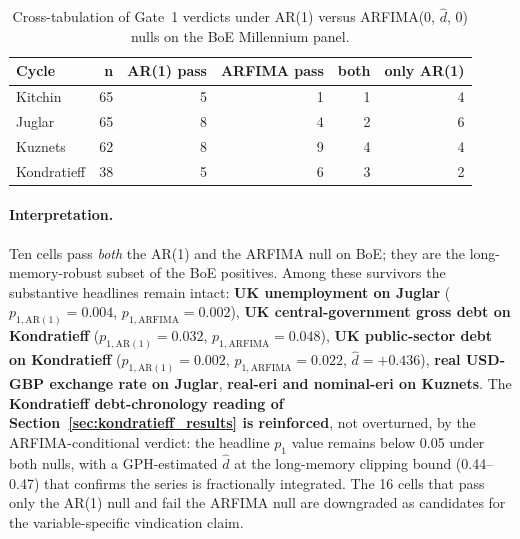 \begin{table}[h]
\centering
\caption{Cross-tabulation of Gate~1 verdicts under AR(1)
versus ARFIMA(0, \(\hat d\), 0) nulls on the BoE Millennium
panel.}
\label{tab:arfima_vs_ar1_boe}
\small
\begin{tabularx}{\linewidth}{@{}X r r r r r@{}}
\toprule
\textbf{Cycle} & \textbf{n} & \textbf{AR(1) pass} & \textbf{ARFIMA pass} & \textbf{both} & \textbf{only AR(1)} \\
\midrule
Kitchin       & 65 & 5 & 1 & 1 & 4 \\
Juglar        & 65 & 8 & 4 & 2 & 6 \\
Kuznets       & 62 & 8 & 9 & 4 & 4 \\
Kondratieff   & 38 & 5 & 6 & 3 & 2 \\
\bottomrule
\end{tabularx}
\end{table}

\paragraph{Interpretation.}
Ten cells pass \emph{both} the AR(1) and the ARFIMA null on
BoE; they are the long-memory-robust subset of the BoE
positives. Among these survivors the substantive
headlines remain intact: \textbf{UK unemployment on Juglar}
(\(p_{1,\mathrm{AR(1)}}=0.004\), \(p_{1,\mathrm{ARFIMA}}=0.002\)),
\textbf{UK central-government gross debt on Kondratieff}
(\(p_{1,\mathrm{AR(1)}}=0.032\),
\(p_{1,\mathrm{ARFIMA}}=0.048\)), \textbf{UK public-sector
debt on Kondratieff}
(\(p_{1,\mathrm{AR(1)}}=0.002\),
\(p_{1,\mathrm{ARFIMA}}=0.022\), \(\hat d=+0.436\)),
\textbf{real USD-GBP exchange rate on Juglar},
\textbf{real-eri and nominal-eri on Kuznets}. The
\textbf{Kondratieff debt-chronology reading of
Section~\ref{sec:kondratieff_results} is reinforced}, not
overturned, by the ARFIMA-conditional verdict: the headline
\(p_1\) value remains below 0.05 under both nulls, with a
GPH-estimated \(\hat d\) at the long-memory clipping bound
(0.44--0.47) that confirms the series is fractionally
integrated. The 16 cells that pass only the AR(1) null and
fail the ARFIMA null are downgraded as candidates for the
variable-specific vindication claim.
